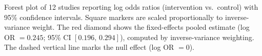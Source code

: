 \caption{Forest plot of 12 studies reporting log odds ratios (intervention vs.\ control) with 95\% confidence intervals. Square markers are scaled proportionally to inverse-variance weight. The red diamond shows the fixed-effects pooled estimate (log OR $= 0.245$; 95\% CI $[0.196,\, 0.294]$), computed by inverse-variance weighting. The dashed vertical line marks the null effect (log OR $= 0$).}
